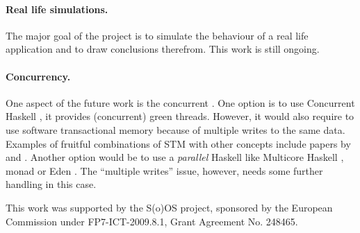 \paragraph{Real life simulations.}
The major goal of the project is to simulate the behaviour of a real life application and to draw conclusions therefrom. This work is still ongoing.

\paragraph{Concurrency.}
One aspect of the future work is the concurrent \soosim. One option is to use Concurrent Haskell \cite{ConcHs}, it provides (concurrent) green threads.
However, it would also require to use software transactional memory \cite{springerlink:10.1007/s004460050028} because of multiple writes to the same data.
Examples of fruitful combinations of STM  with other concepts include papers by \citeauthor{Harris:2008:CMT:1378704.1378725} \cite{Harris:2008:CMT:1378704.1378725} and \citeauthor{Bieniusa:2010:BAA:1835698.1835714} \cite{Bieniusa:2010:BAA:1835698.1835714}.
Another option would be to use a \emph{parallel} Haskell like Multicore Haskell \cite{marlow:rsm},  monad \cite{par-monad} or Eden \cite{eden}.
The ``multiple writes'' issue, however, needs some further handling in this case.

%

\acks

This work was supported by the S(o)OS project, sponsored by the European Commission under FP7-ICT-2009.8.1, Grant Agreement No. 248465.

